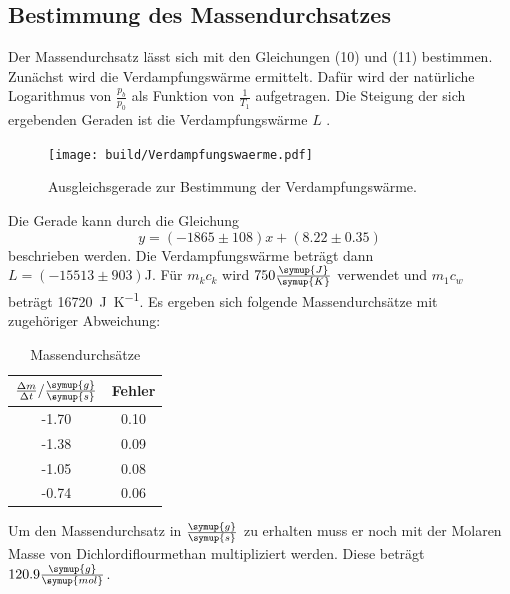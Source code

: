 \subsection{Bestimmung des Massendurchsatzes}
Der Massendurchsatz lässt sich mit den Gleichungen (10) und (11) bestimmen. Zunächst
wird die Verdampfungswärme ermittelt. Dafür wird der natürliche Logarithmus von
$\frac{p_b}{p_0}$ als Funktion von $\frac{1}{T_1}$ aufgetragen. Die Steigung der sich ergebenden
Geraden ist die Verdampfungswärme $L$ \cite{sample2}.
\begin{figure}[H]
  \centering
  \texttt{[image: build/Verdampfungswaerme.pdf]}
  \caption{Ausgleichsgerade zur Bestimmung der Verdampfungswärme.}
  \label{fig:Verdampfungswaerme}
\end{figure}
Die Gerade kann durch die Gleichung
\begin{equation}
  y = (-1865 \pm 108)x + (8.22 \pm 0.35)
\end{equation}
beschrieben werden.
Die Verdampfungswärme beträgt dann $L = (-15513 \pm 903)$J.
Für $m_kc_k$ wird $750 \frac{\symup{J}}{\symup{K}}$ verwendet und $m_1c_w$ beträgt \SI{16720}{\joule\per\kelvin}.
Es ergeben sich folgende Massendurchsätze mit zugehöriger Abweichung:
\begin{table}[H]
  \centering
  \caption{Massendurchsätze}
  \label{tab:Massendurchsätze}
  \begin{tabular}{c c}
    \toprule
    $\frac{\Delta m}{\Delta t}/\frac{\symup{g}}{\symup{s}}$ & Fehler \\
    \midrule
    -1.70 & 0.10 \\
    -1.38 & 0.09 \\
    -1.05 & 0.08 \\
    -0.74 & 0.06 \\
    \bottomrule
  \end{tabular}
\end{table}
Um den Massendurchsatz in $\frac{\symup{g}}{\symup{s}}$ zu erhalten muss er noch
mit der Molaren Masse von Dichlordiflourmethan multipliziert werden.
Diese beträgt $120.9\frac{\symup{g}}{\symup{mol}}$.

